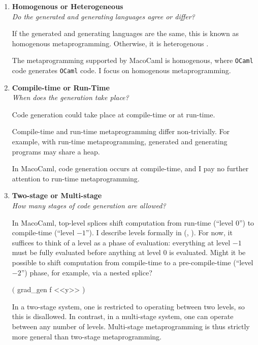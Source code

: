 \begin{enumerate}
  \item \textbf{\textsf{Homogenous or Heterogeneous}}\\
         \textit{Do the generated and generating languages agree or differ?}
  
        If the generated and generating languages are the same, this is known as {homogenous} metaprogramming. Otherwise, it is {heterogenous} \citep{kiselyov-2024}.

        The metaprogramming supported by MacoCaml is homogenous, where \texttt{OCaml} code generates \texttt{OCaml} code. I focus on homogenous metaprogramming.

  \item \textbf{\textsf{Compile-time or Run-Time}} \\
        \textit{When does the generation take place?}

        Code generation could take place at compile-time or at run-time.

        
        Compile-time and run-time metaprogramming differ non-trivially. For example, with run-time metaprogramming, generated and generating programs may share a heap. 

        In MacoCaml, code generation occurs at compile-time, and I pay no further attention to run-time metaprogramming.
        
  \item \textbf{\textsf{Two-stage or Multi-stage}} \\
  \textit{How many stages of code generation are allowed?}

  In MacoCaml, top-level splices shift computation from run-time (``level $0$'') to compile-time (``level $-1$''). I describe levels formally in  (, ). For now, it suffices to think of a level as a phase of evaluation: everything at level $-1$ must be fully evaluated before anything at level $0$ is evaluated. Might it be possible to shift computation from compile-time to a pre-compile-time (``level $-2$'') phase, for example, via a nested splice?
  \begin{macocaml}
$($ grad_gen f <<y>> )
  \end{macocaml}
  In a two-stage system, one is restricted to operating between two levels, so this is disallowed. In contrast, in a multi-stage system, one can operate between any number of levels. Multi-stage metaprogramming is thus strictly more general than two-stage metaprogramming.
  

\end{enumerate}

